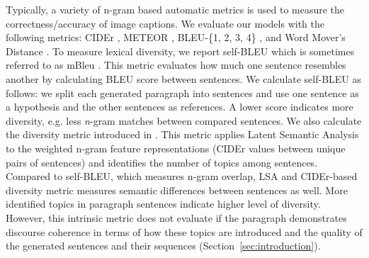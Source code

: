 \documentclass[11pt,a4paper]{article}
\begin{document}
Typically, a variety of n-gram based automatic metrics is used to measure the correctness/accuracy of image captions.
We evaluate our models %
with the following metrics: CIDEr \cite{vedantam2014cider}, METEOR \cite{meteor14}, BLEU-\{1, 2, 3, 4\} \cite{bleu}, and Word Mover's Distance \cite{Kusner2015FromWE,kilickaya2017}.
To measure lexical diversity, we report self-BLEU \cite{Zhu2018selfbleu} which is sometimes referred to as mBleu \cite{Shetty2017}. %
This metric evaluates how much one sentence resembles another by calculating BLEU score between sentences.
We calculate self-BLEU as follows: we split each generated paragraph into sentences and use one sentence as a hypothesis and the other sentences as references.
A lower score indicates more diversity, e.g. less \textit{n}-gram matches between compared sentences.
We also calculate the diversity metric introduced in \cite{wang2019describing}.
This metric applies Latent Semantic Analysis \cite{deerwester90indexing} to the weighted n-gram feature representations (CIDEr values between unique pairs of sentences) and identifies the number of topics among sentences.
Compared to self-BLEU, which measures n-gram overlap, LSA and CIDEr-based diversity metric measures semantic differences between sentences as well.
More identified topics in paragraph sentences indicate higher level of diversity.
However, this intrinsic metric does not evaluate if the paragraph demonstrates discourse coherence in terms of how these topics are introduced and the quality of the generated sentences and their sequences (Section~\ref{sec:introduction}). %

\end{document}
